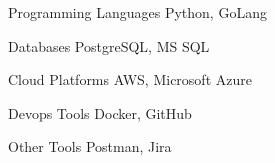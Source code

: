 

\begin{cvskills}

          \cvskill
            {Programming Languages} %
            {Python, GoLang} %
          

          \cvskill
            {Databases} %
            {PostgreSQL, MS SQL} %
          

          \cvskill
            {Cloud Platforms} %
            {AWS, Microsoft Azure} %
          

          \cvskill
            {Devops Tools} %
            {Docker, GitHub} %
          

          \cvskill
            {Other Tools} %
            {Postman, Jira} %
          
\end{cvskills}
